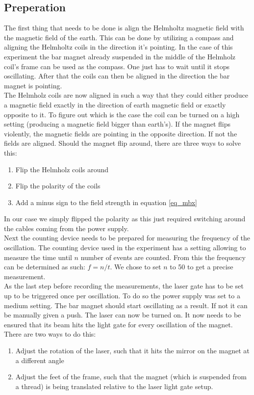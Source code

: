 \documentclass[14pt]{article}
\begin{document}
\subsection{Preperation}
The first thing that needs
to be done is align the Helmholtz magnetic field with the magnetic field of the earth. This can be done by utilizing a
compass and aligning the Helmholtz coils in the direction it's pointing. In the case of this experiment the bar
magnet already suspended in the middle of the Helmholz coil's frame can be used as the compass. One just has to
wait until it stops oscillating. After that the coils can then be aligned in the direction the bar magnet is pointing.\\
The Helmholz coils are now aligned in such a way that they could either produce a magnetic field exactly in the direction
of earth magnetic field or exactly opposite to it. To figure out which is the case the coil can be turned on a high setting
(producing a magnetic field bigger than earth's). If the magnet flips violently, the magnetic fields are pointing in the
opposite direction. If not the fields are aligned. Should the magnet flip around, there are three ways to solve this:
\begin{enumerate}
  \item Flip the Helmholz coils around
  \item Flip the polarity of the coils
  \item Add a minus sign to the field strength in equation \ref{eq_mbx}
\end{enumerate}

In our case we simply flipped the polarity as this just required switching around the cables coming from the power
supply.\\

Next the counting device needs to be prepared for measuring the frequency of the oscillation.
The counting device used in the experiment has a setting allowing to measure the time until $n$ number of events
are counted. From this the frequency can be determined as such: $f = n/t$. We chose to set $n$ to 50 to get a
precise measurement.\\

As the last step before recording the measurements, the laser gate has to be set up to be triggered once per oscillation.
To do so the power supply was set to a medium setting. The bar magnet should start oscillating as a result. If not 
it can be manually given a push. The laser can now be turned on. It now needs to be ensured that its beam hits the 
light gate for every oscillation of the magnet. There are two ways to do this:
\begin{enumerate}
  \item Adjust the rotation of the laser, such that it hits the mirror on the magnet at a different angle
  \item Adjust the feet of the frame, such that the magnet (which is suspended from a thread) is being translated
  relative to the laser light gate setup.
\end{enumerate}
\end{document}
